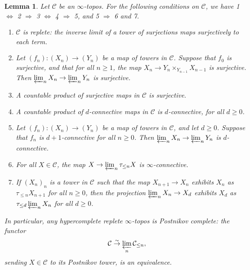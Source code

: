 \documentclass[12pt]{article}
\newtheorem{lemma}[theorem]{Lemma}
\begin{document}
\begin{lemma}\label{replete}
Let $\mathcal{C}$ be an $\infty$-topos.  For the following conditions on $\mathcal{C}$, we have 
1 $\Leftrightarrow$ 2 $\Rightarrow$ 3 $\Leftrightarrow$ 4 $\Rightarrow$ 5, and 5 $\Rightarrow$ 6 and 7.
\begin{enumerate}
\item $\mathcal{C}$ is replete: the inverse limit of a tower of surjections maps surjectively to each term.
\item Let $(f_n):(X_n)\rightarrow (Y_n)$ be a map of towers in $\mathcal{C}$.  Suppose that $f_0$ is surjective, and that for all $n\geq 1$, the map $X_n\rightarrow Y_n\times_{Y_{n-1}} X_{n-1}$ is surjective.  Then $\varprojlim_n X_n\rightarrow \varprojlim_n Y_n$ is surjective.
\item A countable product of surjective maps in $\mathcal{C}$ is surjective.
\item A countable product of $d$-connective maps in $\mathcal{C}$ is $d$-connective, for all $d\geq 0$.
\item Let $(f_n):(X_n)\rightarrow (Y_n)$ be a map of towers in $\mathcal{C}$, and let $d\geq 0$.  Suppose that $f_n$ is $d+1$-connective for all $n\geq 0$.  Then $\varprojlim_n X_n\rightarrow \varprojlim_n Y_n$ is $d$-connective.
\item For all $X\in\mathcal{C}$, the map $X\rightarrow \varprojlim_n \tau_{\leq n}X$ is $\infty$-connective.
\item If $(X_n)_n$ is a tower in $\mathcal{C}$ such that the map $X_{n+1}\rightarrow X_n$ exhibits $X_n$ as $\tau_{\leq n}X_{n+1}$ for all $n\geq 0$, then the projection $\varprojlim_n X_n\rightarrow X_d$ exhibits $X_d$ as $\tau_{\leq d}\varprojlim_n X_n$ for all $d\geq 0$.
\end{enumerate}

In particular, any hypercomplete replete $\infty$-topos is \emph{Postnikov complete}: the functor
$$\mathcal{C}\overset{\sim}{\rightarrow}\varprojlim_n \mathcal{C}_{\leq n},$$
sending $X\in\mathcal{C}$ to its Postnikov tower, is an equivalence.
\end{lemma}
\end{document}
